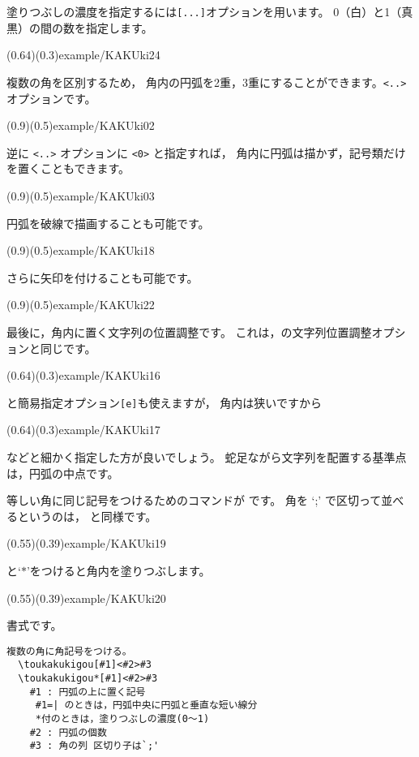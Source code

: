 塗りつぶしの濃度を指定するには\verb+[...]+オプションを用います。
0（白）と1（真黒）の間の数を指定します。

\showexample[円弧の内部を黒で塗りつぶす](0.64)(0.3){example/KAKUki24}

複数の角を区別するため，
角内の円弧を2重，3重にすることができます。\texttt{<..>}オプションです。

\showexample[円弧を二重に](0.9)(0.5){example/KAKUki02}

逆に \texttt{<..>} オプションに \texttt{<0>} と指定すれば，
角内に円弧は描かず，記号類だけを置くこともできます。

\showexample[円弧なし](0.9)(0.5){example/KAKUki03}

円弧を破線で描画することも可能です。

\showexample[破線の円弧](0.9)(0.5){example/KAKUki18}

さらに矢印を付けることも可能です。

\showexample[破線の円弧に矢印](0.9)(0.5){example/KAKUki22}

最後に，角内に置く文字列の位置調整です。
これは，の文字列位置調整オプションと同じです。

(0.64)(0.3){example/KAKUki16}

\noindent
と簡易指定オプション\verb/[e]/も使えますが，
角内は狭いですから

(0.64)(0.3){example/KAKUki17}

\noindent
などと細かく指定した方が良いでしょう。
蛇足ながら文字列を配置する基準点は，円弧の中点です。

等しい角に同じ記号をつけるためのコマンドが  です。
角を `;' で区切って並べるというのは， と同様です。

(0.55)(0.39){example/KAKUki19}

と`$*$'をつけると角内を塗りつぶします。

(0.55)(0.39){example/KAKUki20}

書式です。

\begin{boxnote}
\begin{verbatim}
複数の角に角記号をつける。
  \toukakukigou[#1]<#2>#3
  \toukakukigou*[#1]<#2>#3
    #1 : 円弧の上に置く記号
     #1=| のときは，円弧中央に円弧と垂直な短い線分
     *付のときは，塗りつぶしの濃度(0〜1)
    #2 : 円弧の個数
    #3 : 角の列 区切り子は`;'
\end{verbatim}
\end{boxnote}

